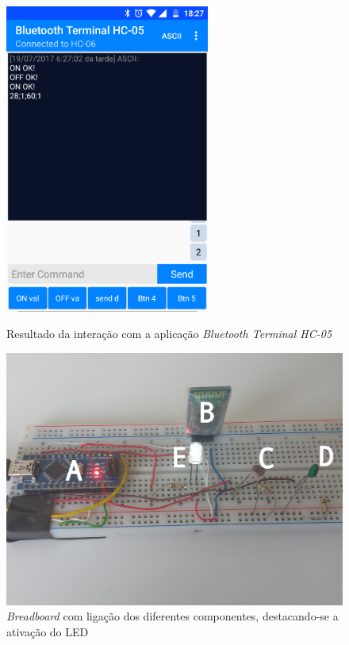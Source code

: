 \begin{figure}[h]
	\centering
	\begin{minipage}[b]{0.49\textwidth}
		\centering
		\includegraphics[width=0.6\textwidth]{img/comm-blue/print-app-teste.png}
		\caption{Resultado da interação com a aplicação \textit{Bluetooth Terminal HC-05}}
		\label{bluetth05-res}
	\end{minipage}
	\hfill
	\begin{minipage}[b]{0.49\textwidth}
		\centering
		\includegraphics[width=\textwidth]{img/comm-blue/resultado_on_off.jpg}
		\caption{\textit{Breadboard} com ligação dos diferentes componentes, destacando-se a ativação do \ac{LED}}
		\label{comimageesquema}
	\end{minipage}
\end{figure}



